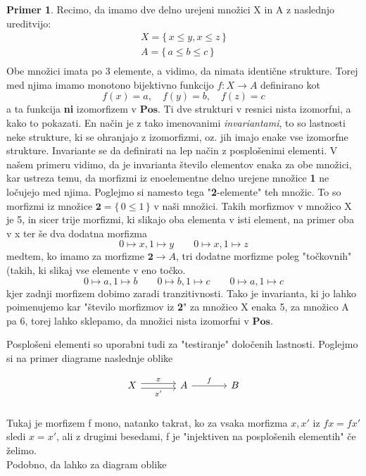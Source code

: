 \documentclass[12pt,a4paper]{book}
\theoremstyle{definition}
\theoremstyle{plain}
\theoremstyle{definition}
\newtheorem{primer}{Primer}[section]
\theoremstyle{remark}
\newcommand{\cat}[1]{\textbf{#1}}
\renewcommand{\set}[1]{\{\,#1\,\}}
\begin{document}
\begin{primer}
Recimo, da imamo dve delno urejeni množici X in A z naslednjo ureditvijo:
\begin{align*}
X = \set{x \leq y, x \leq z} \\
A = \set{a \leq b \leq c} \\
\end{align*}
Obe množici imata po 3 elemente, a vidimo, da nimata identične strukture. Torej med njima imamo monotono bijektivno funkcijo $f : X \to A$ definirano kot
$$f(x) = a, \quad f(y) = b, \quad f(z) = c$$
a ta funkcija \textbf{ni} izomorfizem v $\cat{Pos}$. Ti dve strukturi v resnici nista izomorfni, a kako to pokazati. En način je z tako imenovanimi \textit{invariantami}, to so lastnosti neke strukture, ki se ohranjajo z izomorfizmi, oz. jih imajo enake vse izomorfne strukture. Invariante se da definirati na lep način z posplošenimi elementi. V našem primeru vidimo, da je invarianta število elementov enaka za obe množici, kar ustreza temu, da morfizmi iz enoelementne delno urejene množice \textbf{1} ne ločujejo med njima. Poglejmo si namesto tega "\textbf{2}-elemente" teh množic. To so morfizmi iz množice $\textbf{2} = \set{0 \leq 1}$ v naši množici. Takih morfizmov v množico X je 5, in sicer trije morfizmi, ki slikajo oba elementa v isti element, na primer oba v x ter še dva dodatna morfizma
$$0 \mapsto x, 1 \mapsto y \qquad 0 \mapsto x, 1 \mapsto z$$
medtem, ko imamo za morfizme $\textbf{2} \to A$, tri dodatne morfizme poleg "točkovnih" (takih, ki slikaj vse elemente v eno točko.
$$0 \mapsto a, 1 \mapsto b \qquad 0 \mapsto b, 1 \mapsto c \qquad 0 \mapsto a, 1 \mapsto c$$
kjer zadnji morfizem dobimo zaradi tranzitivnosti.
Tako je invarianta, ki jo lahko poimenujemo kar "število morfizmov iz \textbf{2}" za množico X enaka 5, za množico A pa 6, torej lahko sklepamo, da množici nista izomorfni v $\cat{Pos}$.
\end{primer}

Posplošeni elementi so uporabni tudi za "testiranje" določenih lastnosti. Poglejmo si na primer diagrame naslednje oblike

$$\begin{tikzcd}[column sep=large]
X \ar[r, shift left, "x"] \ar[r, shift right, "x'"'] & A \ar[r, "f"] & B \\
\end{tikzcd}$$
Tukaj je morfizem f mono, natanko takrat, ko za vsaka morfizma $x, x'$ iz $fx = fx'$ sledi $x = x'$, ali z drugimi besedami, f je "injektiven na posplošenih elementih" če želimo. \\
Podobno, da lahko za diagram oblike 
\end{document}
